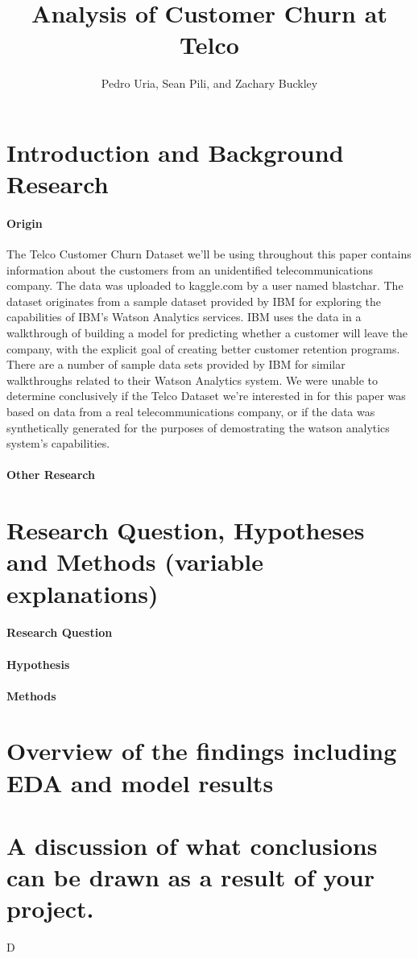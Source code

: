 \documentclass[man]{apa6}
\title{Analysis of Customer Churn at Telco}
\author{Pedro Uria, Sean Pili, and Zachary Buckley}
\affiliation{George Washington University}
\begin{document}
\maketitle

\section{Introduction and Background Research}
\paragraph{Origin}
The Telco Customer Churn Dataset we'll be using throughout this paper contains information about the customers from an unidentified telecommunications company. The data was uploaded to kaggle.com by a user named blastchar. \cite{blastchar_2018} The dataset originates from a sample dataset provided by IBM for exploring the capabilities of IBM's Watson Analytics services. IBM uses the data in a walkthrough of building a model for predicting whether a customer will leave the company, with the explicit goal of creating better customer retention programs. \cite{ibm_telco_2015} There are a number of sample data sets provided by IBM for similar walkthroughs related to their Watson Analytics system. \cite{ibm_data_2015} We were unable to determine conclusively if the Telco Dataset we're interested in for this paper was based on data from a real telecommunications company, or if the data was synthetically generated for the purposes of demostrating the watson analytics system's capabilities.

\paragraph{Other Research}


\section{Research Question, Hypotheses and Methods (variable explanations)}
\paragraph{Research Question}
\paragraph{Hypothesis}
\paragraph{Methods}
\section{Overview of the findings including EDA and model results}

\section{A discussion of what conclusions can be drawn as a result of your project.}
D

\newpage
\printbibliography
\end{document}
